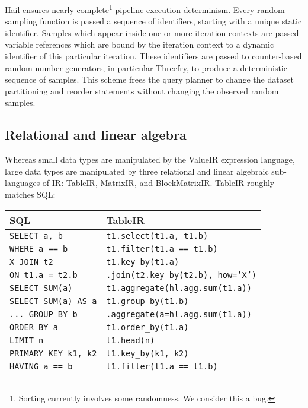 \documentclass[10pt,a4paper%
]{article}
\begin{document}
Hail ensures nearly complete\footnote{Sorting currently involves some randomness. We consider this a
bug.} pipeline execution determinism. Every random sampling function is passed a sequence of
identifiers, starting with a unique static identifier. Samples which appear inside one or more
iteration contexts are passed variable references which are bound by the iteration context to a
dynamic identifier of this particular iteration. These identifiers are passed to counter-based
random number generators, in particular Threefry, to produce a deterministic sequence of
samples. This scheme frees the query planner to change the dataset partitioning and reorder
statements without changing the observed random samples.

\subsection{Relational and linear algebra}

Whereas small data types are manipulated by the ValueIR expression language, large data types are
manipulated by three relational and linear algebraic sub-languages of IR: TableIR, MatrixIR, and
BlockMatrixIR. TableIR roughly matches SQL:

\begin{tabular}{||l l||}
 \hline
 SQL & TableIR \\ [0.5ex]
 \hline\hline
 \texttt{SELECT a, b} & \texttt{t1.select(t1.a, t1.b)} \\
 \hline
 \texttt{WHERE a == b} & \texttt{t1.filter(t1.a == t1.b)} \\
 \hline
 \texttt{X JOIN t2} & \texttt{t1.key\_by(t1.a)} \\
 \texttt{ON t1.a = t2.b} & \texttt{.join(t2.key\_by(t2.b), how='X')} \\
 \hline
 \texttt{SELECT SUM(a)} & \texttt{t1.aggregate(hl.agg.sum(t1.a))} \\
 \hline
 \texttt{SELECT SUM(a) AS a} & \texttt{t1.group\_by(t1.b)} \\
 \texttt{... GROUP BY b} & \texttt{.aggregate(a=hl.agg.sum(t1.a))} \\
 \hline
 \texttt{ORDER BY a} & \texttt{t1.order\_by(t1.a)} \\
 \hline
 \texttt{LIMIT n} & \texttt{t1.head(n)} \\
 \hline
 \texttt{PRIMARY KEY k1, k2} & \texttt{t1.key\_by(k1, k2)} \\
 \hline
 \texttt{HAVING a == b} & \texttt{t1.filter(t1.a == t1.b)} \\
 \hline
\end{tabular}
\end{document}
